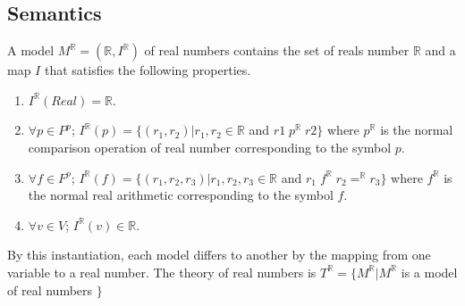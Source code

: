 \subsection{Semantics}
A model $M^{\mathbb{R}} = (\mathbb{R}, I^{\mathbb{R}})$ of real numbers contains the set of reals number $\mathbb{R}$ and a map $I$ that satisfies the following properties.
\begin{enumerate}
\item $I^{\mathbb{R}}(Real) = \mathbb{R}$.
\item $\forall p \in P^p$; $I^{\mathbb{R}}(p) = \{(r_1, r_2) | r_1, r_2 \in \mathbb{R}$ and $r1 \; p^{\mathbb{R}} \; r2\}$ where $p^{\mathbb{R}}$ is the normal comparison operation of real number corresponding to the symbol $p$.
\item $\forall f \in F^p$; $I^{\mathbb{R}}(f) = \{(r_1, r_2, r_3) | r_1, r_2, r_3 \in \mathbb{R}$ and $r_1 \; f^{\mathbb{R}} \; r_2 =^{\mathbb{R}} r_3\}$ where $f^{\mathbb{R}}$ is the normal real arithmetic corresponding to the symbol $f$.
\item $\forall v \in V$; $I^{\mathbb{R}}(v) \in \mathbb{R}$.
\end{enumerate}
By this instantiation, each model differs to another by the mapping from one variable to a real number.
The theory of real numbers is $T^{\mathbb{R}} = \{M^{\mathbb{R}} | M^{\mathbb{R}}$ is a model of real numbers $\}$
